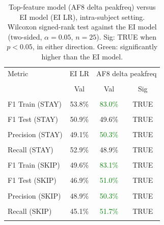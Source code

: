\begin{table}[H]
\centering
\begin{tabular}{lccc}
\hline
Metric & EI LR & \multicolumn{2}{c}{AF8 delta peakfreq} \\\\
 & Val & Val & Sig \\\\
\hline
F1 Train (STAY) & 53.8\% & \textcolor{green}{83.0\%} & TRUE \\\\
F1 Test (STAY) & 50.9\% & 49.6\% & TRUE \\\\
Precision (STAY) & 49.1\% & \textcolor{green}{50.3\%} & TRUE \\\\
Recall (STAY) & 52.9\% & 48.9\% & TRUE \\\\
F1 Train (SKIP) & 49.6\% & \textcolor{green}{83.1\%} & TRUE \\\\
F1 Test (SKIP) & 46.9\% & \textcolor{green}{51.0\%} & TRUE \\\\
Precision (SKIP) & 48.9\% & \textcolor{green}{50.3\%} & TRUE \\\\
Recall (SKIP) & 45.1\% & \textcolor{green}{51.7\%} & TRUE \\\\
\hline
\end{tabular}
\caption{Top-feature model (AF8 delta peakfreq) versus EI model (EI LR), intra-subject setting. Wilcoxon signed-rank test against the EI model (two-sided, $\alpha=0.05$, $n=25$). Sig: TRUE when $p<0.05$, in either direction. Green: significantly higher than the EI model.}
\label{tab:metrics_5_intra_2}
\end{table}